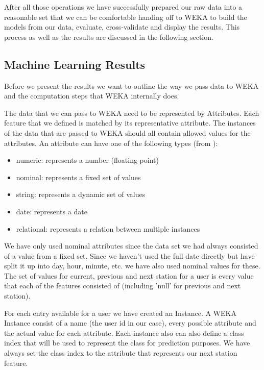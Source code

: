 After all those operations we have successfully prepared our raw data into a reasonable set that we can be comfortable handing off to WEKA to build the models from our data, evaluate, cross-validate and display the results. This process as well as the results are discussed in the following section.

\subsection{Machine Learning Results}
Before we present the results we want to outline the way we pass data to WEKA and the computation steps that WEKA internally does.

The data that we can pass to WEKA need to be represented by Attributes. Each feature that we defined is matched by its representative attribute. The instances of the data that are passed to WEKA should all contain allowed values for the attributes. An attribute can have one of the following types (from \cite{WEKAJavaDocAttribute}):
\begin{itemize}
	\item numeric: represents a number (floating-point)
	\item nominal: represents a fixed set of values
	\item string: represents a dynamic set of values
	\item date: represents a date
	\item relational: represents a relation between multiple instances
\end{itemize}


We have only used nominal attributes since the data set we had always consisted of a value from a fixed set. Since we haven't used the full date directly but have split it up into day, hour, minute, etc. we have also used nominal values for these. The set of values for current, previous and next station for a user is every value that each of the features consisted of (including 'null' for previous and next station).

For each entry available for a user we have created an Instance. A WEKA Instance consist of a name (the user id in our case), every possible attribute and the actual value for each attribute. Each instance also can also define a class index that will be used to represent the class for prediction purposes. We have always set the class index to the attribute that represents our next station feature.

